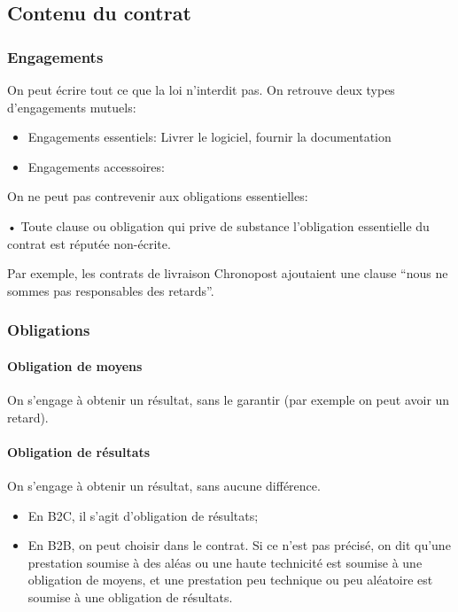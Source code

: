 \documentclass[10pt,a4paper,french]{article}
\begin{document}
\subsection{Contenu du contrat}

\subsubsection{Engagements}
On peut écrire tout ce que la loi n'interdit pas. On retrouve deux types d'engagements mutuels:
\begin{itemize}
\item Engagements essentiels: Livrer le logiciel, fournir la documentation
\item Engagements accessoires: 
\end{itemize}

On ne peut pas contrevenir aux obligations essentielles:

\begin{cquote}{•}
Toute clause ou obligation qui prive de substance l'obligation essentielle du contrat est réputée non-écrite.
\end{cquote}
Par exemple, les contrats de livraison Chronopost ajoutaient une clause ``nous ne sommes pas responsables des retards''.

\subsubsection{Obligations}
\paragraph{Obligation de moyens}
On s'engage à obtenir un résultat, sans le garantir (par exemple on peut avoir un retard).

\paragraph{Obligation de résultats}
On s'engage à obtenir un résultat, sans aucune différence.

\begin{itemize}
\item En B2C, il s'agit d'obligation de résultats;
\item En B2B, on peut choisir dans le contrat. Si ce n'est pas précisé, on dit qu'une prestation soumise à des aléas ou une haute technicité est soumise à une obligation de moyens, et une prestation peu technique ou peu aléatoire est soumise à une obligation de résultats.
\end{itemize}
\end{document}
